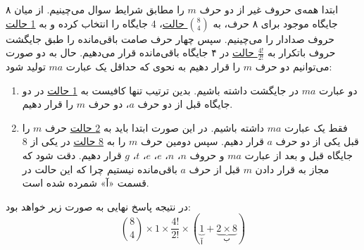 \p
ابتدا همه‌ی حروف غیر از دو حرف $m$ را مطابق شرایط سوال می‌چینیم.
از میان ۸ جایگاه موجود برای ۸ حرف، به 
\underline{${8\choose 4}$ حالت}، 
4
جایگاه را انتخاب کرده و به
\underline{1 حالت}
حروف صدادار را می‌چینیم.
سپس چهار حرف صامت باقی‌مانده
را طبق جایگشت حروف باتکرار به
 \underline{$\frac{4!}{2!}$ حالت}
در ۴ جایگاه باقی‌مانده قرار می‌دهیم.
حال به دو صورت می‌توانیم دو حرف $m$ را قرار دهیم به نحوی که حداقل یک عبارت 
$ma$ تولید شود:
\begin{enumerate}
  \item 
  دو عبارت  $ma$  در جایگشت داشته باشیم.
   بدین ترتیب تنها کافیست به 
  \underline{1 حالت}
   در دو جایگاه قبل از دو حرف 
   $a$،  
   دو حرف 
   $m$ را قرار دهیم.

  \item
  فقط یک عبارت $ma$ داشته‌ باشیم. 
  در این صورت ابتدا باید به
  \underline{2 حالت}
  حرف 
  $m$ 
  را قبل یکی از دو حرف 
  $a$ 
  قرار دهیم. 
  سپس
   دومین حرف
  $m$
  را
  به
  \underline{8 حالت}
  در یکی از 8 جایگاه قبل و بعد از عبارت 
  $ma$
   و حروف 
   $n$، 
   $n$، 
   $e$، 
   $e$، 
   $t$، 
   $g$ 
   قرار دهیم.
   دقت شود که مجاز به قرار دادن 
  $m$
  قبل از حرف 
  $a$ 
  باقی‌مانده 
  نیستیم چرا که این حالت در قسمت «آ» شمرده شده است.
\end{enumerate}
\p
در نتیجه پاسخ نهایی به صورت زیر خواهد بود:
$${8\choose 4} \times 1 \times \frac{4!}{2!} \times (\underbrace{1}_{\text{آ}} + \underbrace{2 \times 8}_{\text{ب}})$$